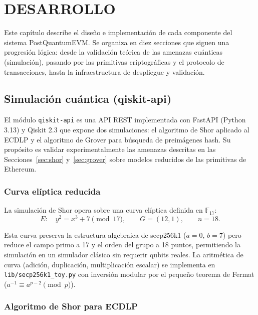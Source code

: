 \chapter{DESARROLLO}
\label{cap:desarrollo}

Este capítulo describe el diseño e implementación de cada componente del sistema PostQuantumEVM. Se organiza en diez secciones que siguen una progresión lógica: desde la validación teórica de las amenazas cuánticas (simulación), pasando por las primitivas criptográficas y el protocolo de transacciones, hasta la infraestructura de despliegue y validación.


\section{Simulación cuántica (qiskit-api)}
\label{sec:dev_qiskit}

El módulo \texttt{qiskit-api} es una API REST implementada con FastAPI (Python 3.13) y Qiskit 2.3 que expone dos simulaciones: el algoritmo de Shor aplicado al ECDLP y el algoritmo de Grover para búsqueda de preimágenes hash. Su propósito es validar experimentalmente las amenazas descritas en las Secciones~\ref{sec:shor} y~\ref{sec:grover} sobre modelos reducidos de las primitivas de Ethereum.

\subsection{Curva elíptica reducida}

La simulación de Shor opera sobre una curva elíptica definida en $\mathbb{F}_{17}$:
\begin{equation}
  E: \quad y^2 = x^3 + 7 \pmod{17}, \qquad G = (12, 1), \qquad n = 18.
  \label{eq:toy_curve}
\end{equation}

Esta curva preserva la estructura algebraica de secp256k1 ($a = 0$, $b = 7$) pero reduce el campo primo a 17 y el orden del grupo a 18 puntos, permitiendo la simulación en un simulador clásico sin requerir qubits reales. La aritmética de curva (adición, duplicación, multiplicación escalar) se implementa en \texttt{lib/secp256k1\_toy.py} con inversión modular por el pequeño teorema de Fermat ($a^{-1} \equiv a^{p-2} \pmod{p}$).

\subsection{Algoritmo de Shor para ECDLP}

